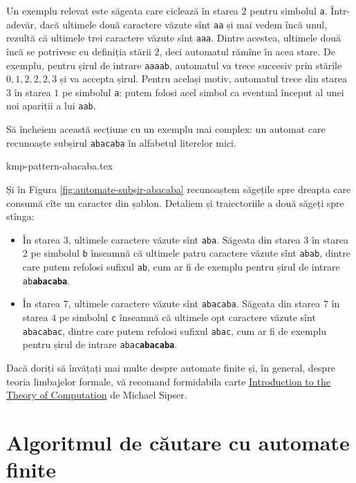 \documentclass[../main.tex]{subfiles}
\begin{document}
Un exemplu relevat este săgeata care ciclează în starea $2$ pentru simbolul
\texttt{a}. Într-adevăr, dacă ultimele două caractere văzute sînt \texttt{aa}
și mai vedem încă unul, rezultă că ultimele trei caractere văzute sînt
\texttt{aaa}. Dintre acestea, ultimele două încă se potrivesc cu definiția
stării $2$, deci automatul rămîne în acea stare. De exemplu, pentru șirul de
intrare \texttt{aaaab}, automatul va trece succesiv prin stările $0, 1, 2, 2,
2, 3$ și va accepta șirul. Pentru același motiv, automatul trece din starea
$3$ în starea $1$ pe simbolul \texttt{a}: putem folosi acel simbol ca eventual
început al unei noi apariții a lui \texttt{aab}.

Să încheiem această secțiune cu un exemplu mai complex: un automat care
recunoaște subșirul \texttt{abacaba} în alfabetul literelor mici.

{kmp-pattern-abacaba.tex}

Și în Figura \ref{fig:automate-subșir-abacaba} recunoaștem săgețile spre
dreapta care consumă cîte un caracter din șablon. Detaliem și traiectoriile a
două săgeți spre stînga:

\begin{itemize}
\item În starea $3$, ultimele caractere văzute sînt \texttt{aba}. Săgeata din
  starea $3$ în starea $2$ pe simbolul \texttt{b} înseamnă că ultimele patru
  caractere văzute sînt \texttt{abab}, dintre care putem refolosi sufixul
  \texttt{ab}, cum ar fi de exemplu pentru șirul de intrare
  \texttt{ab\textbf{abacaba}}.
\item În starea $7$, ultimele caractere văzute sînt \texttt{abacaba}.  Săgeata
  din starea $7$ în starea $4$ pe simbolul \texttt{c} înseamnă că ultimele opt
  caractere văzute sînt \texttt{abacabac}, dintre care putem refolosi sufixul
  \texttt{abac}, cum ar fi de exemplu pentru șirul de intrare
  \texttt{abac\textbf{abacaba}}.
\end{itemize}

Dacă doriți să învățați mai multe despre automate finite și, în general, despre teoria limbajelor formale, vă recomand formidabila carte \href{https://github.com/surbhi498/book/blob/master/Introduction\%20to\%20the\%20Theory\%20of\%20Computation\%20by\%20Michael\%20Sipser.pdf}{Introduction to the Theory of Computation} de Michael Sipser.


\section{Algoritmul de căutare cu automate finite}
\end{document}
